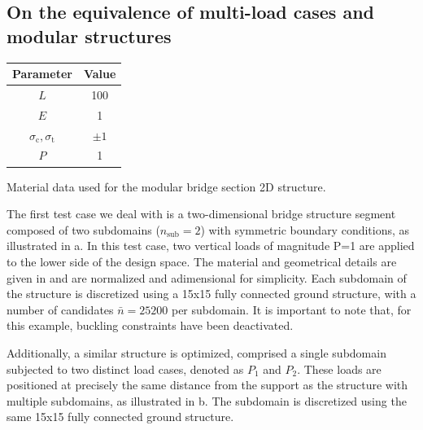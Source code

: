 \subsection{On the equivalence of multi-load cases and modular structures}
\begin{margintable}
    \small
    \centering
    \begin{tabular}{cc}
    \toprule
    \textbf{Parameter}        & \textbf{Value} \\ \midrule
    $L$              & 100     \\
    $E$              & 1     \\
    $\sigma_\text{c}, \sigma_\text{t}$ & $\pm 1$\\
    $P$              & 1   \\
    \bottomrule
    \end{tabular}
    \caption{Material data used for the modular bridge section 2D structure.}
    \label{tab:05_modular_data}
\end{margintable}
The first test case we deal with is a two-dimensional bridge structure segment composed of two subdomains ($n_{\text{sub}} = 2$) with symmetric boundary conditions, as illustrated in a. In this test case, two vertical loads of magnitude P=1 are applied to the lower side of the design space. The material and geometrical details are given in  and are normalized and adimensional for simplicity. Each subdomain of the structure is discretized using a 15x15 fully connected ground structure, with a number of candidates $\bar{n}=25200$ per subdomain. It is important to note that, for this example, buckling constraints have been deactivated.

Additionally, a similar structure is optimized, comprised a single subdomain subjected to two distinct load cases, denoted as $P_1$ and $P_2$. These loads are positioned at precisely the same distance from the support as the structure with multiple subdomains, as illustrated in b. The subdomain is discretized using the same 15x15 fully connected ground structure.

